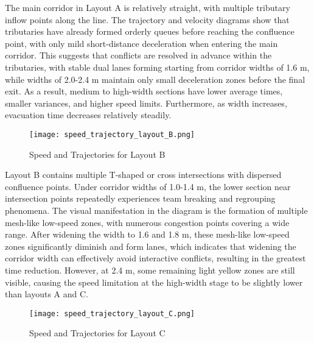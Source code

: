 The main corridor in Layout A is relatively straight, with multiple tributary inflow points along the line. The trajectory and velocity diagrams show that tributaries have already formed orderly queues before reaching the confluence point, with only mild short-distance deceleration when entering the main corridor. This suggests that conflicts are resolved in advance within the tributaries, with stable dual lanes forming starting from corridor widths of 1.6 m, while widths of 2.0-2.4 m maintain only small deceleration zones before the final exit. As a result, medium to high-width sections have lower average times, smaller variances, and higher speed limits. Furthermore, as width increases, evacuation time decreases relatively steadily.

\begin{figure}[h]
    \centering
    \texttt{[image: speed\_trajectory\_layout\_B.png]}
    \caption{Speed and Trajectories for Layout B}
    \label{fig:speed_trajectory_layout_B}
\end{figure}

Layout B contains multiple T-shaped or cross intersections with dispersed confluence points. Under corridor widths of 1.0-1.4 m, the lower section near intersection points repeatedly experiences team breaking and regrouping phenomena. The visual manifestation in the diagram is the formation of multiple mesh-like low-speed zones, with numerous congestion points covering a wide range. After widening the width to 1.6 and 1.8 m, these mesh-like low-speed zones significantly diminish and form lanes, which indicates that widening the corridor width can effectively avoid interactive conflicts, resulting in the greatest time reduction. However, at 2.4 m, some remaining light yellow zones are still visible, causing the speed limitation at the high-width stage to be slightly lower than layouts A and C.

\begin{figure}[h]
    \centering
    \texttt{[image: speed\_trajectory\_layout\_C.png]}
    \caption{Speed and Trajectories for Layout C}
    \label{fig:speed_trajectory_layout_C}
\end{figure}


